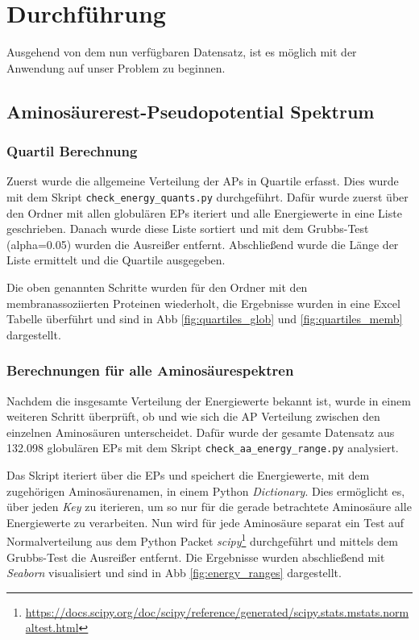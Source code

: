 \chapter{Durchführung}
\label{chap:durchfuerung}

Ausgehend von dem nun verfügbaren Datensatz, ist es möglich mit der Anwendung auf unser Problem zu beginnen.



\section{Aminosäurerest-Pseudopotential Spektrum}


\subsection{Quartil Berechnung}

Zuerst wurde die allgemeine Verteilung der \ac{APs} in Quartile erfasst. Dies wurde mit dem Skript \texttt{check\_energy\_quants.py} durchgeführt. Dafür wurde zuerst über den Ordner mit allen globulären \ac{EP}s iteriert und alle Energiewerte in eine Liste geschrieben. Danach wurde diese Liste sortiert und mit dem Grubbs-Test\cite{Jain.2010} (alpha=0.05) wurden die Ausreißer entfernt. Abschließend wurde die Länge der Liste ermittelt und die Quartile ausgegeben.

Die oben genannten Schritte wurden für den Ordner mit den membranassoziierten Proteinen wiederholt, die Ergebnisse wurden in eine Excel Tabelle überführt und sind in \ac{Abb} \ref{fig:quartiles_glob} und \ref{fig:quartiles_memb} dargestellt.


\subsection{Berechnungen für alle Aminosäurespektren}
Nachdem die insgesamte Verteilung der Energiewerte bekannt ist, wurde in einem weiteren Schritt überprüft, ob und wie sich die \ac{AP} Verteilung zwischen den einzelnen Aminosäuren unterscheidet. Dafür wurde der gesamte Datensatz aus 132.098 globulären \ac{EP}s mit dem Skript \texttt{check\_aa\_energy\_range.py} analysiert. 

Das Skript iteriert über die \ac{EP}s und speichert die Energiewerte, mit dem zugehörigen Aminosäurenamen, in einem Python \emph{Dictionary}. Dies ermöglicht es, über jeden \emph{Key} zu iterieren, um so nur für die gerade betrachtete Aminosäure alle Energiewerte zu verarbeiten. Nun wird für jede Aminosäure separat ein Test auf Normalverteilung aus dem Python Packet \emph{scipy}\footnote{\url{https://docs.scipy.org/doc/scipy/reference/generated/scipy.stats.mstats.normaltest.html}} durchgeführt und mittels dem Grubbs-Test die Ausreißer entfernt. Die Ergebnisse wurden abschließend mit \emph{Seaborn} visualisiert und sind in \ac{Abb} \ref{fig:energy_ranges} dargestellt. 

